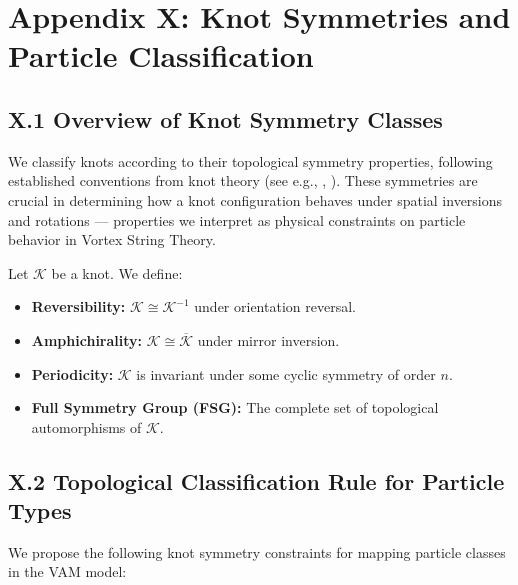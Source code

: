 \documentclass[11pt]{article}
\begin{document}
    \appendix
    \section*{Appendix X: Knot Symmetries and Particle Classification}

    \subsection*{X.1 Overview of Knot Symmetry Classes}

    We classify knots according to their topological symmetry properties, following established conventions from knot theory (see e.g., \cite{BurdeZieschang2003}, \cite{KnotInfo}). These symmetries are crucial in determining how a knot configuration behaves under spatial inversions and rotations — properties we interpret as physical constraints on particle behavior in Vortex String Theory.

    Let $\mathcal{K}$ be a knot. We define:

    \begin{itemize}
        \item \textbf{Reversibility:} $\mathcal{K} \cong \mathcal{K}^{-1}$ under orientation reversal.
        \item \textbf{Amphichirality:} $\mathcal{K} \cong \overline{\mathcal{K}}$ under mirror inversion.
        \item \textbf{Periodicity:} $\mathcal{K}$ is invariant under some cyclic symmetry of order $n$.
        \item \textbf{Full Symmetry Group (FSG):} The complete set of topological automorphisms of $\mathcal{K}$.
    \end{itemize}

    \subsection*{X.2 Topological Classification Rule for Particle Types}

    We propose the following knot symmetry constraints for mapping particle classes in the VAM model:
\end{document}
